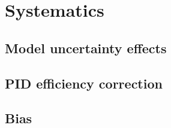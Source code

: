 \chapter{Systematics}
\section{Model uncertainty effects}
\section{PID efficiency correction}
\section{Bias}